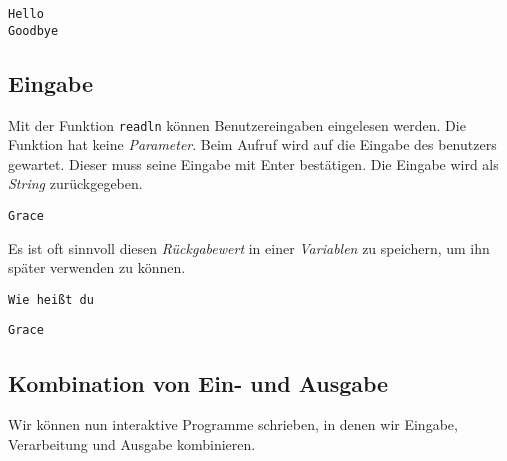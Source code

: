 \begin{verbatim}
Hello
Goodbye
\end{verbatim}

\label{dceed8ad-8d43-42b5-ba88-96c71a14a1eb}
\subsection{Eingabe}\label{eingabe}

Mit der Funktion \texttt{readln} können Benutzereingaben eingelesen
werden. Die Funktion hat keine \emph{Parameter}. Beim Aufruf wird auf
die Eingabe des benutzers gewartet. Dieser muss seine Eingabe mit Enter
bestätigen. Die Eingabe wird als \emph{String} zurückgegeben.

\label{456da678}
\begin{Shaded}
\begin{Highlighting}[]
\OperatorTok{()}
\end{Highlighting}
\end{Shaded}

\begin{verbatim}
Grace
\end{verbatim}

\label{2d1b902a}
Es ist oft sinnvoll diesen \emph{Rückgabewert} in einer \emph{Variablen}
zu speichern, um ihn später verwenden zu können.

\label{b6d8ce43}
\begin{Shaded}
\begin{Highlighting}[]
\OperatorTok{(}\OperatorTok{)}
  \OperatorTok{=}\OperatorTok{()}
\end{Highlighting}
\end{Shaded}

\begin{verbatim}
Wie heißt du
\end{verbatim}

\begin{verbatim}
Grace
\end{verbatim}

\label{1786c834}
\subsection{Kombination von Ein- und
Ausgabe}\label{kombination-von-ein--und-ausgabe}

Wir können nun interaktive Programme schrieben, in denen wir Eingabe,
Verarbeitung und Ausgabe kombinieren.

